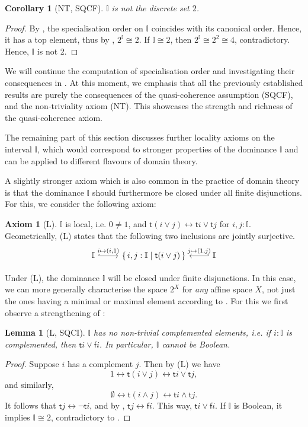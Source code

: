 \documentclass[12pt]{amsart}
\newtheorem{lemma}[theorem]{Lemma}
\newtheorem{corollary}[theorem]{Corollary}
\theoremstyle{definition}
\newtheorem*{axiom}{Axiom}
\newcommand{\mbb}[1]{\mathbb{#1}}
\newcommand{\I}{\mbb I}
\newcommand{\ms}[1]{\mathsf{#1}}
\newcommand{\scomp}[2]{\{\,#1\mid#2\,\}}
\newcommand{\emp}{\emptyset}
\newcommand{\eq}{\leftrightarrow}
\begin{document}
\begin{corollary}[NT, SQCF]\label{cor:intisnot2}
  $\I$ is not the discrete set $2$.
\end{corollary}
\begin{proof}
  By , the specialisation order on $\I$ coincides with its canonical order. Hence, it has a top element, thus by , $2^\I \cong 2$. If $\I \cong 2$, then $2^\I \cong 2^2 \cong 4$, contradictory. Hence, $\I$ is not 2.
\end{proof}

We will continue the computation of specialisation order and investigating their consequences in . At this moment, we emphasis that all the previously established results are purely the consequences of the quasi-coherence assumption (SQCF), and the non-triviality axiom (NT). This showcases the strength and richness of the quasi-coherence axiom.

The remaining part of this section discusses further locality axioms on the interval $\I$, which would correspond to stronger properties of the dominance $\I$ and can be applied to different flavours of domain theory. 

A slightly stronger axiom which is also common in the practice of domain theory is that the dominance $\I$ should furthermore be closed under all finite disjunctions. For this, we consider the following axiom:

\begin{axiom}[L]\label{ax:L}
  $\I$ is local, i.e. $0 \neq 1$, and $\ms t(i\vee j) \eq \ms ti \vee \ms tj$ for $i,j : \I$. Geometrically, (L) states that the following two inclusions are jointly surjective.
  \[ 
  \begin{tikzcd}
    \I \ar[r, hook, "{i \mapsto (i,1)}"] & \scomp{i,j : \I}{\ms t(i\vee j)} & \I \ar[l, hook', "{j \mapsto (1,j)}"']
  \end{tikzcd}
  \]
\end{axiom}

Under (L), the dominance $\I$ will be closed under finite disjunctions. In this case, we can more generally characterise the space $2^X$ for \emph{any} affine space $X$, not just the ones having a minimal or maximal element according to . For this we first observe a strengthening of :

\begin{lemma}[L, SQCI]\label{lem:intisnotBoolean}
  $\I$ has no non-trivial complemented elements, i.e. if $i : \I$ is complemented, then $\ms ti \vee \ms fi$. In particular, $\I$ cannot be Boolean.
\end{lemma}
\begin{proof}
  Suppose $i$ has a complement $j$. Then by (L) we have
  \[ 1 \eq \ms t(i \vee j) \eq \ms ti \vee \ms tj, \]
  and similarly,
  \[ \emp \eq \ms t(i \wedge j) \eq \ms ti \wedge \ms tj. \]
  It follows that $\ms tj \eq \neg \ms ti$, and by , $\ms tj \eq \ms fi$. This way, $\ms ti \vee \ms fi$. If $\I$ is Boolean, it implies $\I \cong 2$, contradictory to .
\end{proof}
\end{document}
